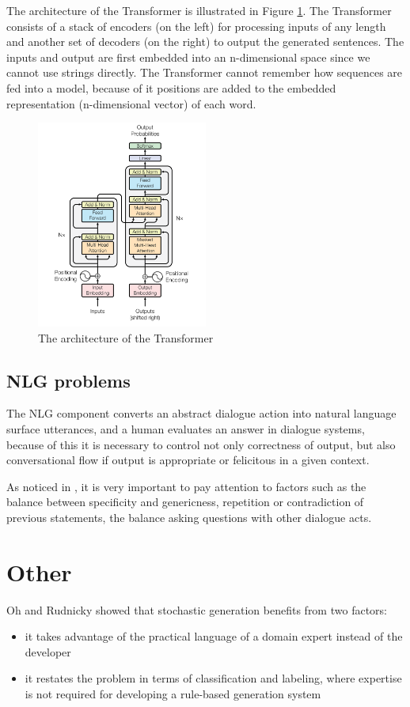 The architecture of the Transformer is illustrated in Figure \ref{transformer}. The Transformer consists of a stack of encoders (on the left) for processing inputs of any length and another set of decoders (on the right) to output the generated sentences. The inputs and output are first embedded into an n-dimensional space since we cannot use strings directly. The Transformer cannot remember how sequences are fed into a model, because of it positions are added to the embedded representation (n-dimensional vector) of each word.

\begin{figure}[hbt]
  \centering
  \includegraphics[width=0.5\textwidth]{figures/transformer.png}
  \caption{The architecture of the Transformer\cite{transformer}}
  \label{transformer}
\end{figure}

\section{NLG problems}
The NLG component converts an abstract dialogue action into natural language surface utterances, and a human evaluates an answer in dialogue systems, because of this it is necessary to control not only correctness of output, but also conversational flow if output is appropriate or felicitous in a given context. 

As noticed in \cite{good_conversation}, it is very important to pay attention to factors such as the balance between specificity and genericness, repetition or contradiction of previous statements, the balance asking questions with other dialogue acts. 
\chapter{Other}
Oh and Rudnicky showed that stochastic generation benefits from two factors: 
\begin{itemize}
  \item it takes advantage of the practical language of a domain expert instead of the developer
  \item it restates the problem in terms of classification and labeling, where expertise is not required for developing a rule-based generation system
\end{itemize}

